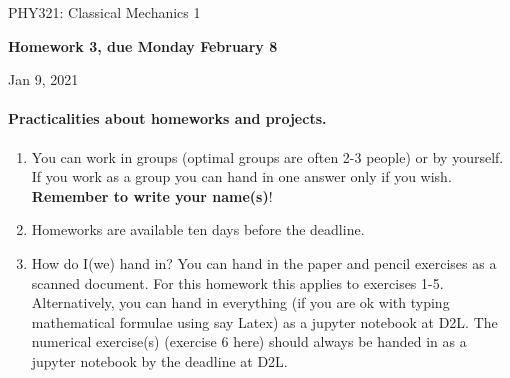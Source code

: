 \documentclass[%
oneside,                 %
final,                   %
10pt]{article}
\begin{document}

\newcommand{\exercisesection}[1]{\subsection*{#1}}






\thispagestyle{empty}

\begin{center}
{\LARGE\bf
\begin{spacing}{1.25}
PHY321: Classical Mechanics 1
\end{spacing}
}
\end{center}


\begin{center}
{\bf Homework 3, due Monday February 8${}^{}$} \\ [0mm]
\end{center}

\begin{center}
\end{center}
    

\begin{center}
Jan 9, 2021
\end{center}

\vspace{1cm}


\paragraph{Practicalities about  homeworks and projects.}
\begin{enumerate}
\item You can work in groups (optimal groups are often 2-3 people) or by yourself. If you work as a group you can hand in one answer only if you wish. \textbf{Remember to write your name(s)}!

\item Homeworks are available ten days  before the deadline. 

\item How do I(we)  hand in?  You can hand in the paper and pencil exercises as a  scanned document. For this homework this applies to exercises 1-5. Alternatively, you can hand in everything (if you are ok with typing mathematical formulae using say Latex) as a jupyter notebook at D2L. The numerical exercise(s) (exercise 6 here) should always be handed in as a jupyter notebook by the deadline at D2L. 
\end{enumerate}
\end{document}
